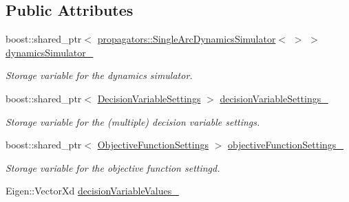 \subsection*{Public Attributes}
\begin{DoxyCompactItemize}
\item 
boost\+::shared\+\_\+ptr$<$ \hyperlink{classtudat_1_1propagators_1_1SingleArcDynamicsSimulator}{propagators\+::\+Single\+Arc\+Dynamics\+Simulator}$<$  $>$ $>$ \hyperlink{structtudat_1_1optimization_1_1MissionSegmentSettings_a276bfcac1c9719c06553124a67b51dfb}{dynamics\+Simulator\+\_\+}\hypertarget{structtudat_1_1optimization_1_1MissionSegmentSettings_a276bfcac1c9719c06553124a67b51dfb}{}\label{structtudat_1_1optimization_1_1MissionSegmentSettings_a276bfcac1c9719c06553124a67b51dfb}

\begin{DoxyCompactList}\small\item\em Storage variable for the dynamics simulator. \end{DoxyCompactList}\item 
boost\+::shared\+\_\+ptr$<$ \hyperlink{structtudat_1_1optimization_1_1DecisionVariableSettings}{Decision\+Variable\+Settings} $>$ \hyperlink{structtudat_1_1optimization_1_1MissionSegmentSettings_a6ce13cf8c15e064ea822687c32f93c96}{decision\+Variable\+Settings\+\_\+}\hypertarget{structtudat_1_1optimization_1_1MissionSegmentSettings_a6ce13cf8c15e064ea822687c32f93c96}{}\label{structtudat_1_1optimization_1_1MissionSegmentSettings_a6ce13cf8c15e064ea822687c32f93c96}

\begin{DoxyCompactList}\small\item\em Storage variable for the (multiple) decision variable settings. \end{DoxyCompactList}\item 
boost\+::shared\+\_\+ptr$<$ \hyperlink{structtudat_1_1optimization_1_1ObjectiveFunctionSettings}{Objective\+Function\+Settings} $>$ \hyperlink{structtudat_1_1optimization_1_1MissionSegmentSettings_a9e6bfd78e3a8223055add035517aded0}{objective\+Function\+Settings\+\_\+}\hypertarget{structtudat_1_1optimization_1_1MissionSegmentSettings_a9e6bfd78e3a8223055add035517aded0}{}\label{structtudat_1_1optimization_1_1MissionSegmentSettings_a9e6bfd78e3a8223055add035517aded0}

\begin{DoxyCompactList}\small\item\em Storage variable for the objective function settingd. \end{DoxyCompactList}\item 
Eigen\+::\+Vector\+Xd \hyperlink{structtudat_1_1optimization_1_1MissionSegmentSettings_ac9b64e893444b93efbb3acedc2c02046}{decision\+Variable\+Values\+\_\+}
\end{DoxyCompactItemize}


